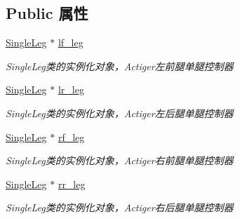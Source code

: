 \subsection*{Public 属性}
\begin{DoxyCompactItemize}
\item 
\mbox{\label{classquadruped_1_1LegControl_a6fa825dc69600f7d48a93d8599efeb0b}} 
\hyperlink{classquadruped_1_1SingleLeg}{Single\+Leg} $\ast$ \hyperlink{classquadruped_1_1LegControl_a6fa825dc69600f7d48a93d8599efeb0b}{lf\+\_\+leg}
\begin{DoxyCompactList}\small\item\em Single\+Leg类的实例化对象，\+Actiger左前腿单腿控制器 \end{DoxyCompactList}\item 
\mbox{\label{classquadruped_1_1LegControl_a43d2e22390ab70584c7a0c84a08724a9}} 
\hyperlink{classquadruped_1_1SingleLeg}{Single\+Leg} $\ast$ \hyperlink{classquadruped_1_1LegControl_a43d2e22390ab70584c7a0c84a08724a9}{lr\+\_\+leg}
\begin{DoxyCompactList}\small\item\em Single\+Leg类的实例化对象，\+Actiger左后腿单腿控制器 \end{DoxyCompactList}\item 
\mbox{\label{classquadruped_1_1LegControl_a22289f16dd7d564bb019dd090b6d2853}} 
\hyperlink{classquadruped_1_1SingleLeg}{Single\+Leg} $\ast$ \hyperlink{classquadruped_1_1LegControl_a22289f16dd7d564bb019dd090b6d2853}{rf\+\_\+leg}
\begin{DoxyCompactList}\small\item\em Single\+Leg类的实例化对象，\+Actiger右前腿单腿控制器 \end{DoxyCompactList}\item 
\mbox{\label{classquadruped_1_1LegControl_a8b355ab811884c9b9ffd835b7c2ab1da}} 
\hyperlink{classquadruped_1_1SingleLeg}{Single\+Leg} $\ast$ \hyperlink{classquadruped_1_1LegControl_a8b355ab811884c9b9ffd835b7c2ab1da}{rr\+\_\+leg}
\begin{DoxyCompactList}\small\item\em Single\+Leg类的实例化对象，\+Actiger右后腿单腿控制器 \end{DoxyCompactList}\item 

\end{DoxyCompactItemize}

